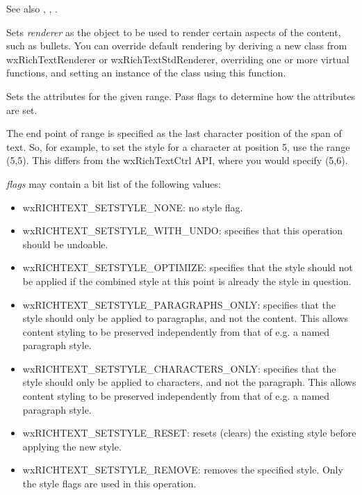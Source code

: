 See also , , .

\label{wxrichtextbuffersetrenderer}


Sets {\it renderer} as the object to be used to render certain aspects of the content, such as bullets.
You can override default rendering by deriving a new class from wxRichTextRenderer or wxRichTextStdRenderer,
overriding one or more virtual functions, and setting an instance of the class using this function.

\label{wxrichtextbuffersetstyle}


Sets the attributes for the given range. Pass flags to determine how the attributes are set.

The end point of range is specified as the last character position of the span of text.
So, for example, to set the style for a character at position 5, use the range (5,5).
This differs from the wxRichTextCtrl API, where you would specify (5,6).

{\it flags} may contain a bit list of the following values:

\begin{itemize}\itemsep=0pt
\item wxRICHTEXT\_SETSTYLE\_NONE: no style flag.
\item wxRICHTEXT\_SETSTYLE\_WITH\_UNDO: specifies that this operation should be undoable.
\item wxRICHTEXT\_SETSTYLE\_OPTIMIZE: specifies that the style should not be applied if the
combined style at this point is already the style in question.
\item wxRICHTEXT\_SETSTYLE\_PARAGRAPHS\_ONLY: specifies that the style should only be applied to paragraphs,
and not the content. This allows content styling to be preserved independently from that of e.g. a named paragraph style.
\item wxRICHTEXT\_SETSTYLE\_CHARACTERS\_ONLY: specifies that the style should only be applied to characters,
and not the paragraph. This allows content styling to be preserved independently from that of e.g. a named paragraph style.
\item wxRICHTEXT\_SETSTYLE\_RESET: resets (clears) the existing style before applying the new style.
\item wxRICHTEXT\_SETSTYLE\_REMOVE: removes the specified style. Only the style flags are used in this operation.
\end{itemize}

